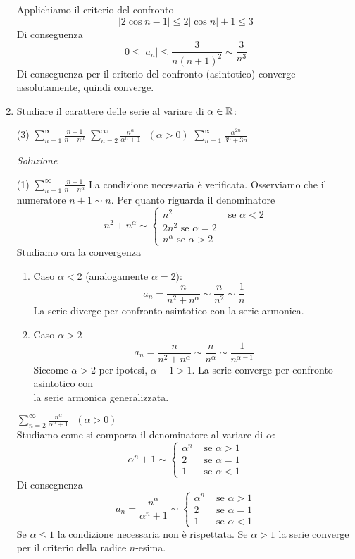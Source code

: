 \documentclass{article}
\newcommand{\se}{\text{ se }}
\begin{document}
\begin{enumerate}[label=\textbf{Esercizio 9.\arabic*.},itemindent=*]
\begin{tasks}
        Applichiamo il criterio del confronto \[|2\cos n-1|\leq 2|\cos n|+1\leq 3\]
        Di conseguenza
        \[0\leq |a_n|\leq \frac{3}{n(n+1)^2}\sim \frac{3}{n^3}\]
        Di conseguenza per il criterio del confronto (asintotico) converge assolutamente, quindi converge.
    \end{tasks}
    \item Studiare il carattere delle serie al variare di $\alpha\in \mathbb{R}$:
    \begin{tasks}(3)
        \task $\sum_{n=1}^\infty\frac{n+1}{n+n^\alpha}$
        \task $\sum_{n=2}^\infty\frac{n^\alpha}{\alpha^n+1}~~~(\alpha>0)$
        \task $\sum_{n=1}^\infty\frac{\alpha^{2n}}{3^n+3n}$
    \end{tasks}
    \item[\textit{\large Soluzione~}]~
    \begin{tasks}(1)
        \task $\sum_{n=1}^\infty\frac{n+1}{n+n^\alpha}$
        La condizione necessaria è verificata. Osserviamo che il numeratore $n+1\sim n$. Per quanto riguarda il denominatore
        \[n^2+n^\alpha\sim\begin{cases}
            n^2&\se \alpha<2\\
            2n^2\se \alpha=2\\
            n^\alpha \se \alpha>2
        \end{cases}\]
        Studiamo ora la convergenza
        \begin{enumerate}
            \item Caso $\alpha<2$ (analogamente $\alpha=2)$:
                \[a_n=\frac{n}{n^2+n^\alpha}\sim \frac{n}{n^2}\sim \frac{1}{n}\]
                La serie diverge per confronto asintotico con la serie armonica. 
            \item Caso $\alpha>2$
                \[a_n=\frac{n}{n^2+n^\alpha}\sim \frac{n}{n^\alpha}\sim \frac{1}{n^{\alpha-1}}\]
                Siccome $\alpha >2$ per ipotesi, $\alpha-1>1$. La serie converge per confronto asintotico con\\ la serie armonica generalizzata.
        \end{enumerate}
        \task $\sum_{n=2}^\infty\frac{n^\alpha}{\alpha^n+1}~~~(\alpha>0)$
        \\Studiamo come si comporta il denominatore al variare di $\alpha$:
        \[\alpha^{n}+1\sim\begin{cases}
            \alpha^n&\se \alpha>1\\
            2 &\se \alpha=1\\
            1 &\se \alpha<1
        \end{cases}\]
        Di consegnenza
        \[a_n=\frac{n^\alpha}{\alpha^{n}+1}\sim\begin{cases}
            \alpha^n&\se \alpha>1\\
            2 &\se \alpha=1\\
            1 &\se \alpha<1
        \end{cases}\]
        Se $\alpha\leq 1$ la condizione necessaria non è rispettata. Se $\alpha>1$ la serie converge per il criterio della radice $n$-esima.


\end{tasks}
\end{enumerate}
\end{document}
